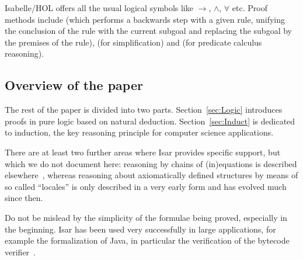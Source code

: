 Isabelle/HOL offers all the usual logical symbols like $\longrightarrow$, $\land$,
$\forall$ etc. Proof methods include  (which performs a backwards
step with a given rule, unifying the conclusion of the rule with the
current subgoal and replacing the subgoal by the premises of the
rule),  (for simplification) and  (for predicate
calculus reasoning).

\subsection{Overview of the paper}

The rest of the paper is divided into two parts.
Section~\ref{sec:Logic} introduces proofs in pure logic based on
natural deduction. Section~\ref{sec:Induct} is dedicated to induction,
the key reasoning principle for computer science applications.

There are at least two further areas where Isar provides specific
support, but which we do not document here: reasoning by chains of
(in)equations is described elsewhere~\cite{BauerW-TPHOLs01}, whereas
reasoning about axiomatically defined structures by means of so called
``locales'' \cite{KWP-TPHOLs99} is only described in a very early
form and has evolved much since then.

Do not be mislead by the simplicity of the formulae being proved,
especially in the beginning. Isar has been used very successfully in
large applications, for example the formalization of Java, in
particular the verification of the bytecode verifier~\cite{KleinN-TCS}.
